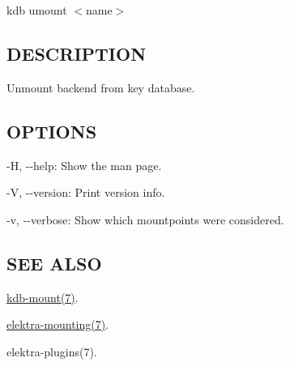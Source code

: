 {\ttfamily kdb umount $<$name$>$}

\subsection*{D\+E\+S\+C\+R\+I\+P\+T\+I\+O\+N}

Unmount backend from key database.

\subsection*{O\+P\+T\+I\+O\+N\+S}


\begin{DoxyItemize}
\item {\ttfamily -\/\+H}, {\ttfamily -\/-\/help}\+: Show the man page.
\item {\ttfamily -\/\+V}, {\ttfamily -\/-\/version}\+: Print version info.
\item {\ttfamily -\/v}, {\ttfamily -\/-\/verbose}\+: Show which mountpoints were considered.
\end{DoxyItemize}

\subsection*{S\+E\+E A\+L\+S\+O}


\begin{DoxyItemize}
\item \hyperlink{md_doc_help_kdb-mount_doc_help_kdb-mount_md}{kdb-\/mount(7)}.
\item \hyperlink{md_doc_help_elektra-mounting_doc_help_elektra-mounting_md}{elektra-\/mounting(7)}.
\item elektra-\/plugins(7). 
\end{DoxyItemize}